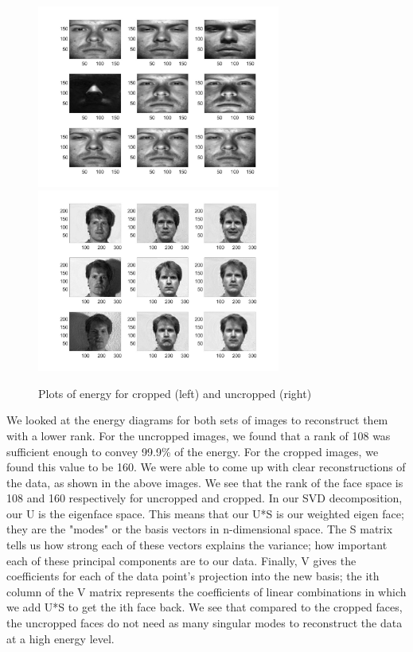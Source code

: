 \documentclass{article}
\begin{document}
\begin{figure}[H]
\begin{center}
\includegraphics[width = 8cm]{crop}
\includegraphics[width = 8cm]{uncrop}
\caption{ Plots of energy for cropped (left) and uncropped (right)}
\end{center}
\end{figure}
We looked at the energy diagrams for both sets of images to reconstruct them with a lower rank. For the uncropped images, we found that a rank of 108 was sufficient enough to convey 99.9\% of the energy. For the cropped images, we found this value to be 160. We were able to come up with clear reconstructions of the data, as shown in the above images. We see that the rank of the face space is 108 and 160 respectively for uncropped and cropped. In our SVD decomposition, our U is the eigenface space. This means that our U*S is our weighted eigen face; they are the "modes" or the basis vectors in n-dimensional space. The S matrix tells us how strong each of these vectors explains the variance; how important each of these principal components are to our data. Finally, V gives the coefficients for each of the data point's projection into the new basis; the ith column of the V matrix represents the coefficients of linear combinations in which we add U*S to get the ith face back. We see that compared to the cropped faces, the uncropped faces do not need as many singular modes to reconstruct the data at a high energy level. \\ \\
\end{document}
